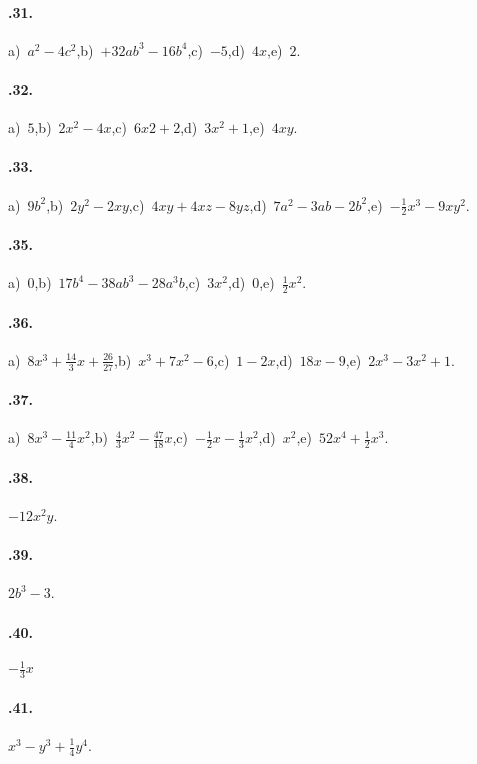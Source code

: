 \paragraph{\thechapter.31.} a)~$a^{2}-4c^{2}$,\quad b)~$+32ab^{3}-16b^{4}$,\quad c)~$-5$,\quad d)~$4x$,\quad e)~$2$.
\paragraph{\thechapter.32.} a)~$5$,\quad b)~$2x^{2}-4x$,\quad c)~$6x{2}+2$,\quad d)~$3x^{2}+1$,\quad e)~$4xy$.
\paragraph{\thechapter.33.} a)~$9b^2$,\quad b)~$2y^{2}-2xy$,\quad c)~$4xy+4xz-8yz$,\quad d)~$7a^2-3ab-2b^2$,\quad e)~$-\frac{1}{2}x^{3}-9xy^{2}$.
\paragraph{\thechapter.35.} a)~$0$,\quad b)~$17b^{4}-38{ab}^{3}-28a^{3}b$,\quad c)~$3x^{2}$,\quad d)~$0$,\quad e)~$\frac{1}{2}x^{2}$.
\paragraph{\thechapter.36.} a)~$8x^{3}+\frac{14}{3}x+\frac{26}{27}$,\quad b)~$x^{3}+7x^{2}-6$,\quad c)~$1-2x$,\quad d)~$18x-9$,\quad e)~$2x^3-3x^2+1$.
\paragraph{\thechapter.37.} a)~$8x^{3}-\frac{11}{4}x^{2}$,\quad b)~$\frac{4}{3}x^{2}-\frac{47}{18}x$,\quad c)~$-{\frac{1}{2}}x-\frac{1}{3}x^{2}$,\quad d)~$x^2$,\quad e)~$52x^4+\frac{1}{2}x^3$.
\paragraph{\thechapter.38.} $-12x^{2}y$.
\paragraph{\thechapter.39.} $2b^3-3$.
\paragraph{\thechapter.40.} $-\frac{1}{3}x$
\paragraph{\thechapter.41.} $x^3-y^3+\frac{1}{4}y^4$.
